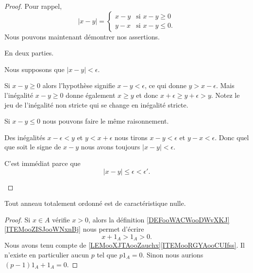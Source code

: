 \begin{proof}
	Pour rappel,
	\begin{equation}
		| x-y |=\begin{cases}
			x-y & \text{si } x-y\geq 0  \\
			y-x & \text{si } x-y\leq 0.
		\end{cases}
	\end{equation}
	Nous pouvons maintenant démontrer nos assertions.
	\begin{subproof}
		 En deux parties.
		\begin{subproof}
			\spitem[\( \Rightarrow\)]
			Nous supposons que \( | x-y |<\epsilon\).

			Si \( x-y\geq 0\) alors l'hypothèse signifie \( x-y<\epsilon\), ce qui donne \( y>x-\epsilon\). Mais l'inégalité \( x-y\geq 0\) donne également \( x\geq y\) et donc \( x+\epsilon\geq y+\epsilon>y\). Notez le jeu de l'inégalité non stricte qui se change en inégalité stricte.

			Si \( x-y\leq 0\) nous pouvons faire le même raisonnement.

			\spitem[\( \Leftarrow\)]
			Des inégalités \( x-\epsilon<y\) et \( y<x+\epsilon\) nous tirons \( x-y<\epsilon\) et \( y-x<\epsilon\). Donc quel que soit le signe de \( x-y\) nous avons toujours \( | x-y |<\epsilon\).
		\end{subproof}

		 C'est immédiat parce que
		\begin{equation}
			| x-y |\leq \epsilon<\epsilon'.
		\end{equation}
	\end{subproof}
\end{proof}


\begin{lemma}       \label{LEMooVZNCooRJatKK}
	Tout anneau totalement ordonné est de caractéristique nulle.
\end{lemma}

\begin{proof}
	Si \( x\in A\) vérifie \( x>0\), alors la définition \ref{DEFooWACWooDWvXKJ}\ref{ITEMooZISJooWNxnBj} nous permet d'écrire
	\begin{equation}
		x+1_A>1_A>0.
	\end{equation}
	Nous avons tenu compte de \ref{LEMooXJTAooZauchx}\ref{ITEMooRGYAooCUIfss}. Il n'existe en particulier aucun \( p\) tel que \( p1_A=0\). Sinon nous aurions \( (p-1)1_A+1_A=0\).
\end{proof}



